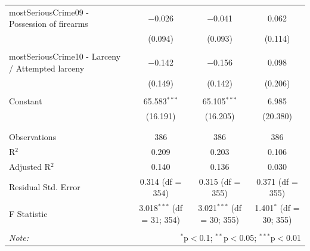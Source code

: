 \documentclass[a4paper,12pt]{article}
\begin{document}
\begin{table}[!htbp]
{\begin{tabular}{@{\extracolsep{5pt}}lccc}
 mostSeriousCrime09 - Possession of firearms & $-$0.026 & $-$0.041 & 0.062 \\ 
  & (0.094) & (0.093) & (0.114) \\ 
  & & & \\ 
 mostSeriousCrime10 - Larceny / Attempted larceny & $-$0.142 & $-$0.156 & 0.098 \\ 
  & (0.149) & (0.142) & (0.206) \\ 
  & & & \\ 
  Constant & 65.583$^{***}$ & 65.105$^{***}$ & 6.985 \\ 
  & (16.191) & (16.205) & (20.380) \\ 
  & & & \\ 
\hline \\[-1.8ex] 
Observations & 386 & 386 & 386 \\ 
R$^{2}$ & 0.209 & 0.203 & 0.106 \\ 
Adjusted R$^{2}$ & 0.140 & 0.136 & 0.030 \\ 
Residual Std. Error & 0.314 (df = 354) & 0.315 (df = 355) & 0.371 (df = 355) \\ 
F Statistic & 3.018$^{***}$ (df = 31; 354) & 3.021$^{***}$ (df = 30; 355) & 1.401$^{*}$ (df = 30; 355) \\ 
\hline 
\hline \\[-1.8ex] 
\textit{Note:}  & \multicolumn{3}{r}{$^{*}$p$<$0.1; $^{**}$p$<$0.05; $^{***}$p$<$0.01} \\ 
\end{tabular} }
\end{table} 



\newpage


\end{document}
